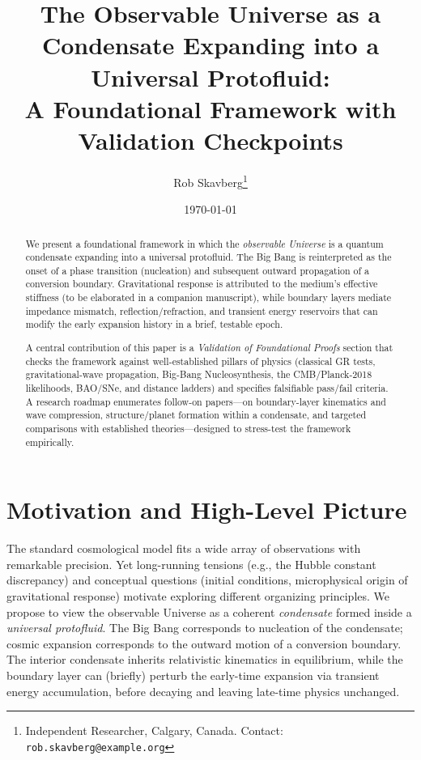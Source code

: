 \documentclass[11pt,a4paper]{article}
\title{\textbf{The Observable Universe as a Condensate Expanding into a Universal Protofluid:\\
A Foundational Framework with Validation Checkpoints}}
\author{Rob Skavberg\thanks{Independent Researcher, Calgary, Canada. Contact: \texttt{rob.skavberg@example.org}}}
\date{\today}
\begin{document}
\maketitle
\doublespacing

\begin{abstract}
We present a foundational framework in which the \emph{observable Universe} is a quantum condensate expanding into a universal protofluid. The Big Bang is reinterpreted as the onset of a phase transition (nucleation) and subsequent outward propagation of a conversion boundary. Gravitational response is attributed to the medium's effective stiffness (to be elaborated in a companion manuscript), while boundary layers mediate impedance mismatch, reflection/refraction, and transient energy reservoirs that can modify the early expansion history in a brief, testable epoch. 
\par
A central contribution of this paper is a \emph{Validation of Foundational Proofs} section that checks the framework against well-established pillars of physics (classical GR tests, gravitational-wave propagation, Big-Bang Nucleosynthesis, the CMB/Planck-2018 likelihoods, BAO/SNe, and distance ladders) and specifies falsifiable pass/fail criteria. A research roadmap enumerates follow-on papers---on boundary-layer kinematics and wave compression, structure/planet formation within a condensate, and targeted comparisons with established theories---designed to stress-test the framework empirically.
\end{abstract}

\section{Motivation and High-Level Picture}
The standard cosmological model fits a wide array of observations with remarkable precision. Yet long-running tensions (e.g., the Hubble constant discrepancy) and conceptual questions (initial conditions, microphysical origin of gravitational response) motivate exploring different organizing principles. We propose to view the observable Universe as a coherent \emph{condensate} formed inside a \emph{universal protofluid}. The Big Bang corresponds to nucleation of the condensate; cosmic expansion corresponds to the outward motion of a conversion boundary. The interior condensate inherits relativistic kinematics in equilibrium, while the boundary layer can (briefly) perturb the early-time expansion via transient energy accumulation, before decaying and leaving late-time physics unchanged.
\end{document}
